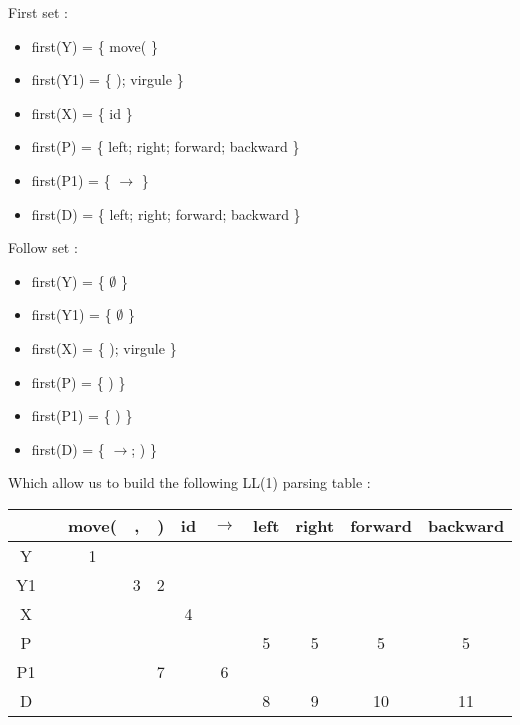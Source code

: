 \documentclass[a4paper, 11pt]{article}
\begin{document}
    \begin{minipage}{\linewidth}
	\begin{minipage}[t]{0.50\linewidth}
		First set :
		\begin{itemize}
			\item first(Y) = \{ move( \}
			\item first(Y1) = \{ ); virgule \}
			\item first(X) = \{ id \}
			\item first(P) = \{ left; right; forward; backward \}
			\item first(P1) = \{ $\rightarrow$ \}
			\item first(D) = \{ left; right; forward; backward \}
		\end{itemize}
	\end{minipage}
    \begin{minipage}[t]{0.05\linewidth}
        \vrule{}
    \end{minipage}
	\begin{minipage}[t]{0.40\linewidth}
		Follow set :
		\begin{itemize}
			\item first(Y) = \{ $\emptyset$ \}
			\item first(Y1) = \{  $\emptyset$ \}
			\item first(X) = \{ ); virgule \}
			\item first(P) = \{ ) \}
			\item first(P1) = \{ ) \}
			\item first(D) = \{ $\rightarrow$; ) \}
		\end{itemize}
	\end{minipage}
	\end{minipage} \newline

	Which allow us to build the following LL(1) parsing table :

	\begin{center}
  		\begin{tabular}{ | c || c | c | c | c | c | c | c | c | c | c |}
    		\hline
    		& & move( & , & ) & id & $\rightarrow$ & left & right & forward & backward
    		\\ \hline
    		Y 	& & 1 & & & & & & & & \\ \hline
    		Y1 	& & & 3 & 2 & & & & & &  \\ \hline
    		X 	& & & & & 4 & & & & &  \\ \hline
    		P 	& & & & & & & 5 & 5 & 5 & 5  \\ \hline
    		P1 	& & & & 7 & & 6 & & & &  \\ \hline
    		D 	& & & & & & & 8 & 9 & 10 & 11  \\ \hline
  		\end{tabular}
	\end{center}
\end{document}
